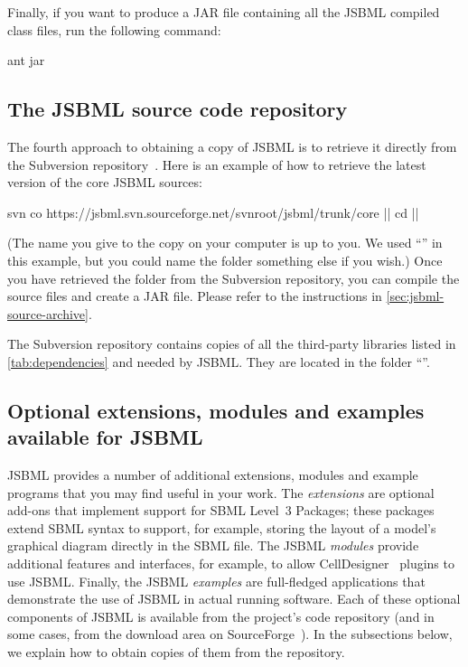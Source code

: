 Finally, if you want to produce a JAR file containing all the JSBML
compiled class files, run the following command:

\begin{example}[style=bash, title={Creating a JAR file.}]
ant jar
\end{example}



\subsection{The JSBML source code repository}
\label{sec:SourceDistribution}

The fourth approach to obtaining a copy of JSBML is to retrieve it directly
from the Subversion repository~\cite{JSBMLSVN}.  Here is an example of how
to retrieve the latest version of the core JSBML sources:

\newcommand{\dirname}{\code{\emph{\color{winered}jsbml}}\xspace}

\begin{example}[style=bash, title={Downloading the latest JSBML 
    sources from the JSBML project's Subversion repository.}]
svn co https://jsbml.svn.sourceforge.net/svnroot/jsbml/trunk/core |\dirname|
cd |\dirname|
\end{example}

(The name you give to the copy on your computer is up to you.  We used
``\dirname'' in this example, but you could name the folder something else
if you wish.)  Once you have retrieved the folder from the Subversion
repository, you can compile the source files and create a JAR file.  Please
refer to the instructions in \vref{sec:jsbml-source-archive}.

The Subversion repository contains copies of all the third-party libraries
listed in \vref{tab:dependencies} and needed by JSBML.  They are
located in the folder ``\dirname{}''.


\subsection{Optional extensions, modules and examples available for JSBML}
\label{sec:dependencies}

JSBML provides a number of additional extensions, modules and example
programs that you may find useful in your work.  The \emph{extensions} are
optional add-ons that implement support for SBML Level~3 Packages; these
packages extend SBML syntax to support, for example, storing the layout of
a model's graphical diagram directly in the SBML file.  The JSBML
\emph{modules} provide additional features and interfaces, for example, to
allow CellDesigner~\cite{Funahashi2003} plugins to use JSBML.  Finally, the
JSBML \emph{examples} are full-fledged applications that demonstrate the
use of JSBML in actual running software.  Each of these optional components
of JSBML is available from the project's code repository (and in some
cases, from the download area on SourceForge~\cite{JSBMLdownload}).  In the
subsections below, we explain how to obtain copies of them from the
repository.


